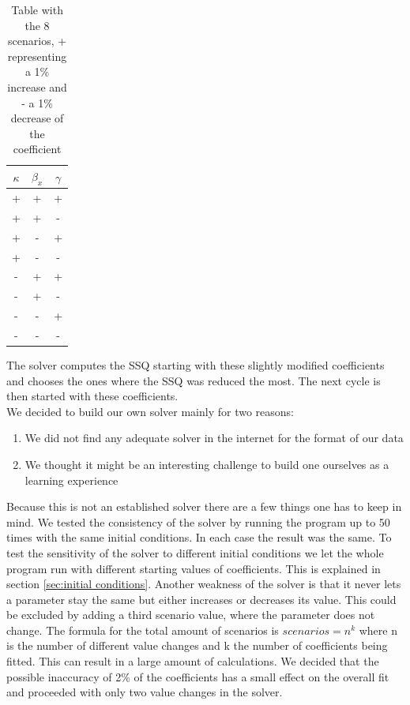 \documentclass[11pt]{article}
\begin{document}
\begin{table}[htb]
\caption{Table with the 8 scenarios, + representing a 1\% increase and - a 1\% decrease of the coefficient }
\centering
\begin{tabular}{|c|c|c|}
\hline 
$\kappa$ & $\beta_{x}$ & $\gamma$ \\ 
\hline 
+ & + & + \\ 
\hline 
+ & + & - \\ 
\hline 
+ & - & + \\ 
\hline 
+ & - & - \\ 
\hline 
- & + & + \\ 
\hline 
- & + & - \\ 
\hline 
- & - & + \\ 
\hline 
- & - & - \\ 
\hline 
\end{tabular} 
\label{tab:solverbuild}
\end{table}




The solver computes the SSQ starting with these slightly modified coefficients and chooses the ones where the SSQ was reduced the most. The next cycle is then started with these coefficients.\\
We decided to build our own solver mainly for two reasons:

\begin{enumerate}
\item We did not find any adequate solver in the internet for the format of our data
\item We thought it might be an interesting challenge to build one ourselves as a learning experience
\end{enumerate}

Because this is not an established solver there are a few things one has to keep in mind. We tested the consistency of the solver by running the program up to 50 times with the same initial conditions. In each case the result was the same. To test the sensitivity of the solver to different initial conditions we let the whole program run with different starting values of coefficients. This is explained in section \ref{sec:initial conditions}. Another weakness of the solver is that it never lets a parameter stay the same but either increases or decreases its value. This could be excluded by adding a third scenario value, where the parameter does not change. The formula for the total amount of scenarios is $scenarios=n^{k}$ where n is the number of different value changes and k the number of coefficients being fitted. This can result in a large amount of calculations. We decided that the possible inaccuracy of 2\% of the coefficients has a small effect on the overall fit and proceeded with only two value changes in the solver.
\end{document}
